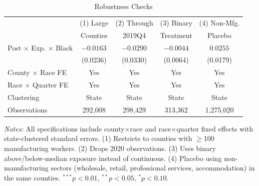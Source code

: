 \begin{table}
\begin{threeparttable}[htbp]
\centering
\caption{Robustness Checks}
\label{tab:robust}
\begin{tabular}{lcccc}
\toprule
 & (1) Large & (2) Through & (3) Binary & (4) Non-Mfg. \\
 & Counties & 2019Q4 & Treatment & Placebo \\
\midrule
Post $\times$ Exp. $\times$ Black & $-0.0163$ & $-0.0290$ & $-0.0044$ & $0.0255$ \\
 & (0.0236) & (0.0330) & (0.0064) & (0.0179) \\
\midrule
County $\times$ Race FE & Yes & Yes & Yes & Yes \\
Race $\times$ Quarter FE & Yes & Yes & Yes & Yes \\
Clustering & State & State & State & State \\
Observations & 292,008 & 298,429 & 313,362 & 1,275,020 \\
\bottomrule
\end{tabular}
\begin{tablenotes}
\small
\item \textit{Notes:} All specifications include county$\times$race and race$\times$quarter fixed effects with state-clustered standard errors. (1) Restricts to counties with $\geq$100 manufacturing workers. (2) Drops 2020 observations. (3) Uses binary above/below-median exposure instead of continuous. (4) Placebo using non-manufacturing sectors (wholesale, retail, professional services, accommodation) in the same counties. $^{***}p<0.01$, $^{**}p<0.05$, $^{*}p<0.10$.
\end{tablenotes}
\end{threeparttable}
\end{table}
